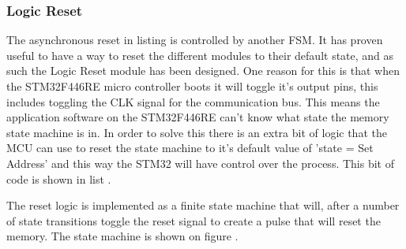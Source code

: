 \subsubsection{Logic Reset}
The asynchronous reset in listing  is controlled by another FSM. It has proven useful to have a way to reset the different modules to their default state, and as such the Logic Reset module has been designed. One reason for this is that when the STM32F446RE micro controller boots it will toggle it's output pins, this includes toggling the CLK signal for the communication bus. This means the application software on the STM32F446RE can't know what state the memory state machine is in. In order to solve this there is an extra bit of logic that the MCU can use to reset the state machine to it's default value of 'state = Set Address' and this way the STM32 will have control over the process. This bit of code is shown in list . 



The reset logic is implemented as a finite state machine that will, after a number of state transitions toggle the reset signal to create a pulse that will reset the memory. The state machine is shown on figure . 

